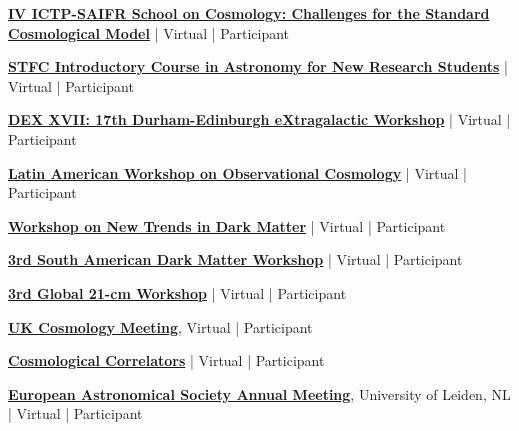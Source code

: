 \begin{scholarship}

                  {\href{https://www.ictp-saifr.org/cosmo2021/}{\textbf{IV 
                  ICTP-SAIFR School on Cosmology: Challenges for the Standard Cosmological Model}} | Virtual | Participant} %
                  

                  {\href{http://astro-online.iopconfs.org/Home}{\textbf{STFC Introductory Course in Astronomy for New Research Students}} | Virtual | Participant} %

                  {\href{https://indico.ph.ed.ac.uk/event/72/overview}{\textbf{DEX XVII: 17th Durham-Edinburgh eXtragalactic Workshop}} | Virtual | Participant} %
                  
                  {\href{https://www.ictp-saifr.org/lawoc2020/}{\textbf{Latin American Workshop on Observational Cosmology}} | Virtual | Participant}   
                  
                  {\href{https://www.ictp-saifr.org/ntdm2020/}{\textbf{Workshop on New Trends in Dark Matter}} | Virtual | Participant}   
                  
                  {\href{https://www.ictp-saifr.org/dmw2020/}{\textbf{3rd South American Dark Matter Workshop}} | Virtual | Participant}  
                  

                  {\href{https://sites.google.com/view/third21cmglobalworkshop/home?authuser=0}{\textbf{3rd Global 21-cm Workshop}} | Virtual | Participant}
                    
                    
                    {\href{http://ukcosmology.co.uks}{\textbf{UK Cosmology Meeting}}, Virtual | Participant}

                 {\href{https://indico.cern.ch/event/943614/registrations/participants}{\textbf{Cosmological Correlators}} | Virtual | Participant} %

                    {\href{https://eas.unige.ch/EAS2020/}{\textbf{
European Astronomical Society Annual Meeting}}, University of Leiden, NL | Virtual | Participant}



\end{scholarship}
